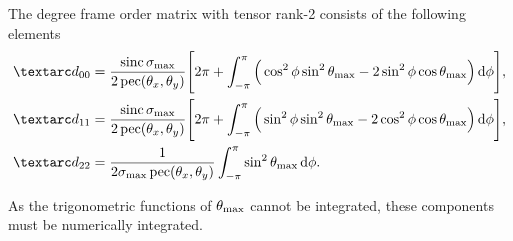 The  degree frame order matrix with tensor rank-2 consists of the following elements
\begin{subequations} \label{eq: pseudo-ellipse 1st degree frame order matrix}
\begin{align}
    \FO_{00} &= \frac{\sinc\conesmax}{2\pec(\conethetax, \conethetay)} \Bigg[
                    2\pi +
                    \int_{-\pi}^{\pi}
                        \Big( \cos^2\phi \sin^2\conethetamax - 2\sin^2\phi \cos\conethetamax \Big)
                    \diff\phi
                \Bigg] , \\
    \FO_{11} &= \frac{\sinc\conesmax}{2\pec(\conethetax, \conethetay)} \Bigg[
                    2\pi +
                    \int_{-\pi}^{\pi}
                        \Big( \sin^2\phi \sin^2\conethetamax - 2\cos^2\phi \cos\conethetamax \Big)
                    \diff\phi
                \Bigg] , \\
    \FO_{22} &= \frac{1}{2\conesmax\pec(\conethetax, \conethetay)}
                    \int_{-\pi}^{\pi}
                        \sin^2\conethetamax
                    \diff\phi .
\end{align}
\end{subequations}

As the trigonometric functions of $\theta_\textrm{max}$ cannot be integrated, these components must be numerically integrated.



